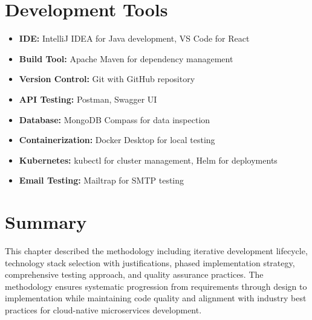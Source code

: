\section{Development Tools}

\begin{itemize}
    \item \textbf{IDE:} IntelliJ IDEA for Java development, VS Code for React
    \item \textbf{Build Tool:} Apache Maven for dependency management
    \item \textbf{Version Control:} Git with GitHub repository
    \item \textbf{API Testing:} Postman, Swagger UI
    \item \textbf{Database:} MongoDB Compass for data inspection
    \item \textbf{Containerization:} Docker Desktop for local testing
    \item \textbf{Kubernetes:} kubectl for cluster management, Helm for deployments
    \item \textbf{Email Testing:} Mailtrap for SMTP testing
\end{itemize}

\section{Summary}

This chapter described the methodology including iterative development lifecycle, technology stack selection with justifications, phased implementation strategy, comprehensive testing approach, and quality assurance practices. The methodology ensures systematic progression from requirements through design to implementation while maintaining code quality and alignment with industry best practices for cloud-native microservices development.
